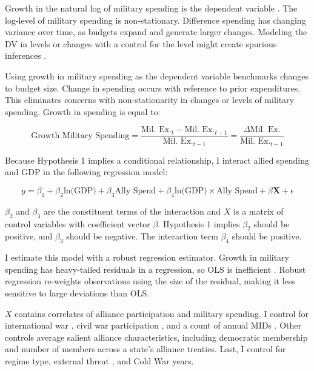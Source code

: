 \documentclass[12pt]{article}
\begin{document}
Growth in the natural log of military spending is the dependent variable \citep{SingerCINC1988}. 
The log-level of military spending is non-stationary.
Difference spending has changing variance over time, as budgets expand and generate larger changes. 
Modeling the DV in levels or changes with a control for the level might create spurious inferences \citep{GrangerNewbold1974}. 


Using growth in military spending as the dependent variable benchmarks changes to budget size. 
Change in spending occurs with reference to prior expenditures. 
This eliminates concerns with non-stationarity in changes or levels of military spending.
Growth in spending is equal to: 


\begin{equation}
\mbox{Growth Military Spending} = \frac{\mbox{Mil. Ex.}_t - \mbox{Mil. Ex.}_{t-1} }{ \mbox{Mil. Ex.}_{t-1} } = \frac{\Delta \mbox{Mil. Ex.} }{ \mbox{Mil. Ex.}_{t-1} }
\end{equation} 


Because Hypothesis 1 implies a conditional relationship, I interact allied spending and GDP in the following regression model:

\begin{equation} 
y = \beta_1 + \beta_2 \mbox{ln(GDP)} + \beta_3 \mbox{Ally Spend} + \beta_4 \mbox{ln(GDP)} \times \mbox{Ally Spend} + \beta \textbf{X} + \epsilon
\end{equation}


$\beta_2$ and $\beta_3$ are the constituent terms of the interaction and \textbf{$X$} is a matrix of control variables with coefficient vector $\beta$.
Hypothesis 1 implies $\beta_2$ should be positive, and $\beta_3$ should be negative. 
The interaction term $\beta_4$ should be positive. 


I estimate this model with a robust regression estimator. 
Growth in military spending has heavy-tailed residuals in a regression, so OLS is inefficient \citep{RaineyBaissa2018}. 
Robust regression re-weights observations using the size of the residual, making it less sensitive to large deviations than OLS. 


\textbf{$X$} contains correlates of alliance participation and military spending. 
I control for international war \citep{Reiteretal2016}, civil war participation \citep{SarkeesWayman2010}, and a count of annual MIDs \citep{Gibleretal2016}. 
Other controls average salient alliance characteristics, including democratic membership \citep{DigiuseppePoast2016} and number of members across a state's alliance treaties.   
Last, I control for regime type, external threat \citep{LeedsSavun2007}, and Cold War years. 
\end{document}
